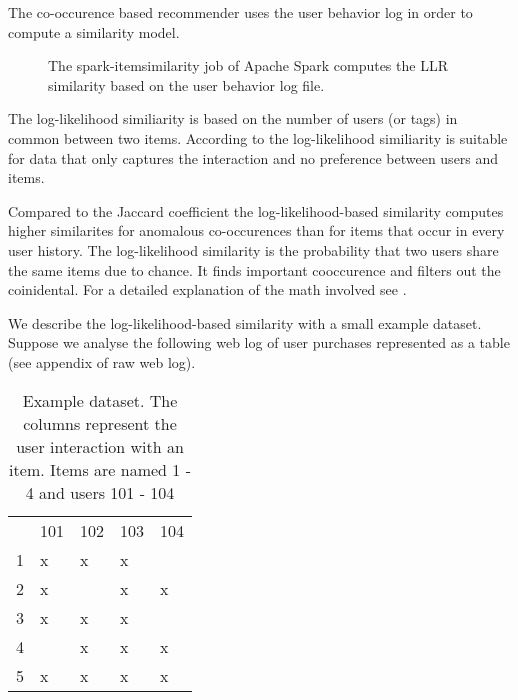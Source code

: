 The co-occurence based recommender uses the user behavior log in order to compute a similarity model. 

\begin{figure}
\centering
{}
\caption{The {\ttfamily spark-itemsimilarity} job of Apache Spark computes the LLR similarity based on the user behavior log file.}
\end{figure}

 The log-likelihood similiarity is based on the number of users (or tags) in common between two items. According to \cite{Dunning93} the log-likelihood similiarity is suitable for data that only captures the interaction and no preference between users and items. 

Compared to the Jaccard coefficient \cite{Hartung} the log-likelihood-based similarity computes higher similarites for anomalous co-occurences than for items that occur in every user history. The log-likelihood similarity  is the probability that two users share the same items due to chance. It finds important cooccurence and filters out the coinidental. For a detailed explanation of the math involved see \cite{Dunning93}. 

We describe the log-likelihood-based similarity with a small example dataset. Suppose we analyse the following web log of user purchases represented as a table (see appendix of raw web log).

\begin{table}
\begin{center}
\begin{tabular}{rllll}
 & 101 & 102 & 103 & 104\\
1 & x & x & x & \\
2 & x &  & x & x\\
3 & x & x & x & \\
4 &  & x & x & x\\
5 & x & x & x & x\\
\end{tabular}
\end{center}
\caption{Example dataset. The columns represent the user interaction with an item. Items are named 1 - 4 and users 101 - 104}
\label{tbl:llr}
\end{table}

